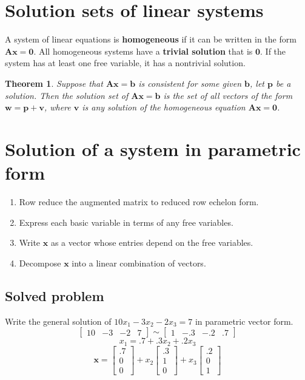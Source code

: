\documentclass[oneside]{book} %
\theoremstyle{plain}
\newtheorem*{theorem*}{Theorem}
\begin{document}
\section{Solution sets of linear systems}
A system of linear equations is \textbf{homogeneous}
if it can be written in the form \( \mathbf{A x} = \mathbf{0} \).
All homogeneous systems have a \textbf{trivial solution} that is \( \mathbf{0} \).
If the system has at least one free variable, it has a nontrivial solution.

\begin{theorem*}
  Suppose that \( \mathbf{Ax} = \mathbf{b} \) is consistent for some given
  \( \mathbf{b} \), let \( \mathbf {p} \) be a solution. Then the solution set of
  \( \mathbf{Ax} = \mathbf{b} \) is the set of all vectors of the form
  \( \mathbf{w} = \mathbf{p} + \mathbf{v} \), where \( \mathbf{v} \) is any
  solution of the homogeneous equation \( \mathbf{Ax} = \mathbf{0} \).
\end{theorem*}

\section{Solution of a system in parametric form}
\begin{enumerate}
\item{Row reduce the augmented matrix to reduced row echelon form.}
\item{Express each basic variable in terms of any free variables.}
\item{Write \(\mathbf{x}\) as a vector whose entries depend on the free
variables.}
\item{Decompose \(\mathbf{x}\) into a linear combination of vectors.}
\end{enumerate}

\subsection*{Solved problem}
Write the general solution of \( 10 x_1 - 3 x_2 - 2 x_3 = 7\) 
in parametric vector form.
\[ \left[ \begin{array}{cccc}
10 & -3 & -2 & 7 \end{array} \right] \sim
\left[ \begin{array}{cccc}
1 & -.3 & -.2 & .7 \end{array} \right] \]
    \[ x_1 = .7 + .3x_2 + .2x_3 \]
  \[ \mathbf{x} = \left[ \begin{array}{c} .7 \\ 0 \\ 0 \end{array} \right]
+ x_2 \left[ \begin{array}{c} .3 \\ 1 \\ 0 \end{array} \right]
+ x_3 \left[ \begin{array}{c} .2 \\ 0 \\ 1 \end{array} \right] \]
\end{document}
